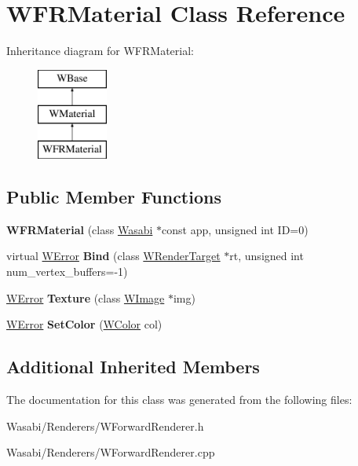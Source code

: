 \hypertarget{class_w_f_r_material}{}\section{W\+F\+R\+Material Class Reference}
\label{class_w_f_r_material}
Inheritance diagram for W\+F\+R\+Material\+:\begin{figure}[H]
\begin{center}
\leavevmode
\includegraphics[height=3.000000cm]{class_w_f_r_material}
\end{center}
\end{figure}
\subsection*{Public Member Functions}
\begin{DoxyCompactItemize}
\item 
{\bfseries W\+F\+R\+Material} (class \hyperlink{class_wasabi}{Wasabi} $\ast$const app, unsigned int ID=0)\hypertarget{class_w_f_r_material_a870f81f67384798616d72ef0bf4228d5}{}\label{class_w_f_r_material_a870f81f67384798616d72ef0bf4228d5}

\item 
virtual \hyperlink{class_w_error}{W\+Error} {\bfseries Bind} (class \hyperlink{class_w_render_target}{W\+Render\+Target} $\ast$rt, unsigned int num\+\_\+vertex\+\_\+buffers=-\/1)\hypertarget{class_w_f_r_material_ab57a021a6e21d2c6dc872d6ea4450093}{}\label{class_w_f_r_material_ab57a021a6e21d2c6dc872d6ea4450093}

\item 
\hyperlink{class_w_error}{W\+Error} {\bfseries Texture} (class \hyperlink{class_w_image}{W\+Image} $\ast$img)\hypertarget{class_w_f_r_material_acc4467bcda7cc98023847549541bd0eb}{}\label{class_w_f_r_material_acc4467bcda7cc98023847549541bd0eb}

\item 
\hyperlink{class_w_error}{W\+Error} {\bfseries Set\+Color} (\hyperlink{class_w_color}{W\+Color} col)\hypertarget{class_w_f_r_material_a934ef9d40c49b7bc0faea7c941746520}{}\label{class_w_f_r_material_a934ef9d40c49b7bc0faea7c941746520}

\end{DoxyCompactItemize}
\subsection*{Additional Inherited Members}


The documentation for this class was generated from the following files\+:\begin{DoxyCompactItemize}
\item 
Wasabi/\+Renderers/W\+Forward\+Renderer.\+h\item 
Wasabi/\+Renderers/W\+Forward\+Renderer.\+cpp\end{DoxyCompactItemize}
